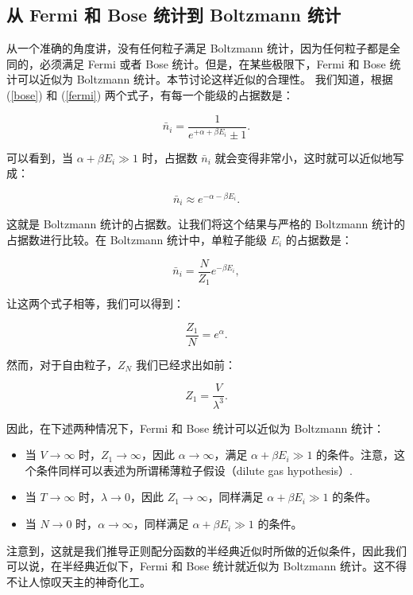 \subsection{从 Fermi 和 Bose 统计到 Boltzmann 统计}
\label{fermi_bose_boltzmann}
从一个准确的角度讲，没有任何粒子满足 Boltzmann 统计，因为任何粒子都是全同的，必须满足 Fermi 或者 Bose 统计。但是，在某些极限下，Fermi 和 Bose 统计可以近似为 Boltzmann 统计。本节讨论这样近似的合理性。
我们知道，根据 (\ref{bose}) 和 (\ref{fermi}) 两个式子，有每一个能级的占据数是：
\begin{linenomath}\begin{equation}
    \bar n_i = \frac{1}{e^{+\alpha + \beta E_i} \pm 1}.
\end{equation}\end{linenomath}
可以看到，当 $\alpha + \beta E_i \gg 1$ 时，占据数 $\bar n_i$ 就会变得非常小，这时就可以近似地写成：
\begin{linenomath}\begin{equation}
    \bar n_i \approx e^{-\alpha - \beta E_i}.
\end{equation}\end{linenomath}
这就是 Boltzmann 统计的占据数。让我们将这个结果与严格的 Boltzmann 统计的占据数进行比较。在 Boltzmann 统计中，单粒子能级 $E_i$ 的占据数是：
\begin{linenomath}\begin{equation}
    \bar n_i = \frac{N}{Z_1} e^{-\beta E_i},
\end{equation}\end{linenomath}
让这两个式子相等，我们可以得到：
\begin{linenomath}\begin{equation}
    \frac{Z_1}{N} = e^{\alpha}.
\end{equation}\end{linenomath}
然而，对于自由粒子，$Z_N$ 我们已经求出如前：
\begin{linenomath}\begin{equation}
    Z_1 = \frac{V}{\lambda^{3}}.
\end{equation}\end{linenomath}
因此，在下述两种情况下，Fermi 和 Bose 统计可以近似为 Boltzmann 统计：
\begin{itemize}
    \item 当 $V \to \infty$ 时，$Z_1 \to \infty$，因此 $\alpha \to \infty$，满足 $\alpha + \beta E_i \gg 1$ 的条件。注意，这个条件同样可以表述为所谓稀薄粒子假设（dilute gas hypothesis）.
    \item 当 $T \to \infty$ 时，$\lambda \to 0$，因此 $Z_1 \to \infty$，同样满足 $\alpha + \beta E_i \gg 1$ 的条件。
    \item 当 $N \to 0$ 时，$\alpha \to \infty$，同样满足 $\alpha + \beta E_i \gg 1$ 的条件。
\end{itemize}
注意到，这就是我们推导正则配分函数的半经典近似时所做的近似条件，因此我们可以说，在半经典近似下，Fermi 和 Bose 统计就近似为 Boltzmann 统计。这不得不让人惊叹天主的神奇化工。

